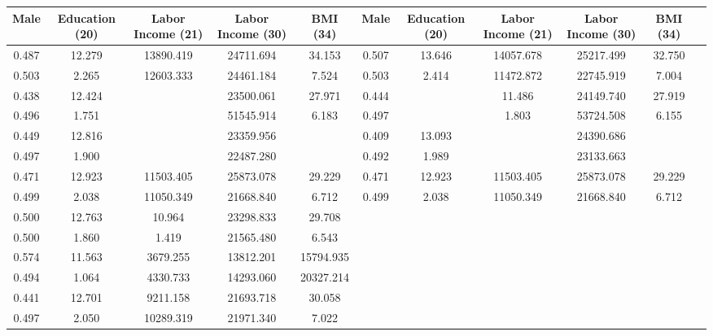 \begin{tabular}{ccccccccccc} \toprule
Male  & Education (20)  & Labor Income (21)  & Labor Income (30)   & BMI (34) & Male  & Education (20)  & Labor Income (21)  & Labor Income (30)   & BMI (34) \\ \midrule
    0.487 &    12.279 & 13890.419 & 24711.694 &    34.153 &     0.507 &    13.646 & 14057.678 & 25217.499 &    32.750 \\  
    0.503 &     2.265 & 12603.333 & 24461.184 &     7.524 &     0.503 &     2.414 & 11472.872 & 22745.919 &     7.004 \\  
    0.438 &    12.424 &     & 23500.061 &    27.971 &     0.444 &     &    11.486 & 24149.740 &    27.919 \\  
    0.496 &     1.751 &      & 51545.914 &     6.183 &     0.497 &      &     1.803 & 53724.508 &     6.155 \\  
    0.449 &    12.816 &   & 23359.956 &  &     0.409 &    13.093 &   & 24390.686 &  \\  
    0.497 &     1.900 &   & 22487.280 &  &     0.492 &     1.989 &   & 23133.663 &  \\  
    0.471 &    12.923 & 11503.405 & 25873.078 &    29.229 &     0.471 &    12.923 & 11503.405 & 25873.078 &    29.229 \\  
    0.499 &     2.038 & 11050.349 & 21668.840 &     6.712 &     0.499 &     2.038 & 11050.349 & 21668.840 &     6.712 \\  
    0.500 &    12.763 &    10.964 & 23298.833 &    29.708 &         &         &         &         &         \\  
    0.500 &     1.860 &     1.419 & 21565.480 &     6.543 &         &         &         &         &          \\  
    0.574 &    11.563 &  3679.255 & 13812.201 & 15794.935 &         &         &         &         &          \\  
    0.494 &     1.064 &  4330.733 & 14293.060 & 20327.214 &         &         &         &         &         \\  
    0.441 &    12.701 &  9211.158 & 21693.718 &    30.058 &         &         &         &         &         \\  
    0.497 &     2.050 & 10289.319 & 21971.340 &     7.022 &         &         &         &         &          \\ \bottomrule \end{tabular}


